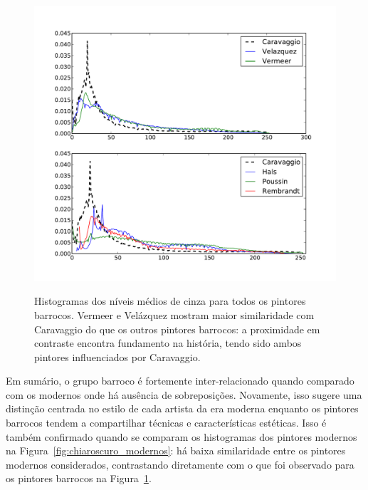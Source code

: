 \begin{figure}[h!]
    
\begin{center}
{    \centering
        \includegraphics[width=\columnwidth]{figs/chiaroscuro}}
      \caption{Histogramas dos níveis médios de cinza para todos os pintores
        barrocos. Vermeer e Velázquez mostram maior similaridade com Caravaggio
        do que os outros pintores barrocos: a proximidade em contraste encontra
        fundamento na história, tendo sido ambos pintores influenciados por
        Caravaggio.}
        \label{fig:chiaroscuro}
  \end{center}
\end{figure}

Em sumário, o grupo barroco é fortemente inter-relacionado quando comparado com
os modernos onde há ausência de sobreposições. Novamente, isso sugere uma
distinção centrada no estilo de cada artista da era moderna enquanto os pintores
barrocos tendem a compartilhar técnicas e características estéticas. Isso é
também confirmado quando se comparam os histogramas dos pintores modernos na
Figura~\ref{fig:chiaroscuro_modernos}: há baixa similaridade entre os pintores
modernos considerados, contrastando diretamente com o que foi observado para os
pintores barrocos na Figura~\ref{fig:chiaroscuro}.

